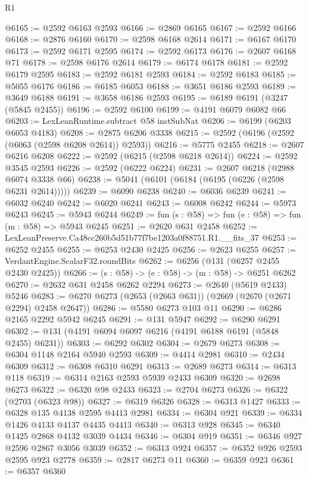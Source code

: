 \begin{lexlean}{R1}
\begin{coremodule}
@6165 := @2592 @6163 @2593
@6166 := @2869 @6165
@6167 := @2592 @6166
@6168 := @2876 @6160
@6170 := @2598 @6168 @2614
@6171 := @6167 @6170
@6173 := @2592 @6171 @2595
@6174 := @2592 @6173
@6176 := @2607 @6168 @71
@6178 := @2598 @6176 @2614
@6179 := @6174 @6178
@6181 := @2592 @6179 @2595
@6183 := @2592 @6181 @2593
@6184 := @2592 @6183
@6185 := @5055 @6176
@6186 := @6185 @6053
@6188 := @3651 @6186 @2593
@6189 := @3649 @6188
@6191 := @3658 @6186 @2593
@6195 := @6189 @6191 (@3247 (@5845 @2455))
@6196 := @2592 @6100
@6199 := @4191 @6079 @6082 @66
@6203 := LexLeanRuntime.subtract @58 instSubNat
@6206 := @6199 (@6203 @6053 @4183)
@6208 := @2875 @6206 @3338
@6215 := @2592 (@6196 (@2592 (@6063 (@2598 @6208 @2614)) @2593))
@6216 := @5775 @2455
@6218 := @2607 @6216 @6208
@6222 := @2592 (@6215 (@2598 @6218 @2614))
@6224 := @2592 @3545 @2593
@6226 := @2592 (@6222 @6224)
@6231 := @2607 @6218 (@2988 @6074 @3338 @66)
@6238 := @5041 (@6101 (@6184 (@6195 (@6226 (@2598 @6231 @2614)))))
@6239 := @6090 @6238
@6240 := @6036 @6239
@6241 := @6032 @6240
@6242 := @6020 @6241
@6243 := @6008 @6242
@6244 := @5973 @6243
@6245 := @5943 @6244
@6249 := fun (s : @58) => fun (e : @58) => fun (m : @58) => @5943 @6245
@6251 := @2620 @631 @2458
@6252 := LexLeanPreserve.Ca48cc260b5d51b77f7be1203a0f88751.R1.__fits_37
@6253 := @6252 @2455
@6255 := @6253 @2430 @2425
@6256 := @2623 @6255
@6257 := VerdantEngine.ScalarF32.roundBits
@6262 := @6256 (@131 (@6257 @2455 @2430 @2425))
@6266 := (s : @58) -> (e : @58) -> (m : @58) -> @6251 @6262
@6270 := @2632 @631 @2458 @6262 @2294
@6273 := @2640 (@5619 @2433) @5246
@6283 := @6270 @6273 (@2653 (@2663 @631)) (@2669 (@2670 (@2671 @2294) @2458 @2647))
@6286 := @5580 @6273 @103 @11
@6290 := @6286 @2165 @2292 @5942 @6245
@6291 := @131 @5947
@6292 := @6290 @6291
@6302 := @131 (@4191 @6094 @6097 @6216 (@4191 @6188 @6191 (@5848 @2455) @6231))
@6303 := @6292 @6302
@6304 := @2679 @6273
@6308 := @6304 @1148 @2164 @5940 @2593
@6309 := @4414 @2981
@6310 := @2434 @6309
@6312 := @6308 @6310 @6291
@6313 := @2689 @6273
@6314 := @6313 @118
@6319 := @6314 @2163 @2593 @5939 @2433 @6309
@6320 := @2698 @6273
@6322 := @6320 @98 @2433
@6323 := @2704 @6273
@6326 := @6322 (@2703 (@6323 @98))
@6327 := @6319 @6326
@6328 := @6313 @1427
@6333 := @6328 @135 @4138 @2595 @4413 @2981
@6334 := @6304 @921
@6339 := @6334 @1426 @4133 @4137 @4435 @4413
@6340 := @6313 @928
@6345 := @6340 @1425 @2868 @4132 @3039 @4434
@6346 := @6304 @919
@6351 := @6346 @927 @2596 @2867 @3056 @3039
@6352 := @6313 @924
@6357 := @6352 @926 @2593 @2595 @923 @2778
@6359 := @2817 @6273 @11
@6360 := @6359 @923
@6361 := @6357 @6360

\end{coremodule}
\end{lexlean}
